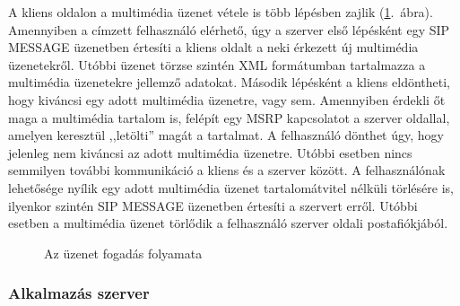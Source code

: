 A kliens oldalon a multimédia üzenet vétele is több lépésben zajlik (\ref{fig:receiving_proc}.~ábra). Amennyiben a címzett felhasználó elérhető, úgy a szerver első lépésként egy SIP MESSAGE üzenetben értesíti a kliens oldalt a neki érkezett új multimédia üzenetekről. Utóbbi üzenet törzse szintén XML formátumban tartalmazza a multimédia üzenetekre jellemző adatokat. Második lépésként a kliens eldöntheti, hogy kiváncsi egy adott multimédia üzenetre, vagy sem. Amennyiben érdekli őt maga a multimédia tartalom is, felépít egy MSRP kapcsolatot a szerver oldallal, amelyen keresztül ,,letölti'' magát a tartalmat. A felhasználó dönthet úgy, hogy jelenleg nem kiváncsi az adott multimédia üzenetre. Utóbbi esetben nincs semmilyen további kommunikáció a kliens és a szerver között. A felhasználónak lehetősége nyílik egy adott multimédia üzenet tartalomátvitel nélküli törlésére is, ilyenkor szintén SIP MESSAGE üzenetben értesíti a szervert erről. Utóbbi esetben a multimédia üzenet törlődik a felhasználó szerver oldali postafiókjából.

\begin{figure}[htbp]
\center
{}
\caption{Az üzenet fogadás folyamata}
\label{fig:receiving_proc}
\end{figure}

\subsubsection{Alkalmazás szerver}
\label{sec:appserver}

